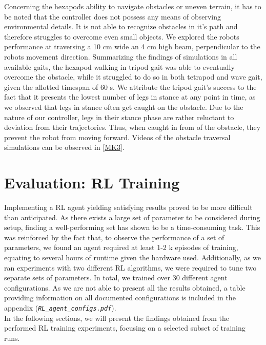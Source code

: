 Concerning the hexapods ability to navigate obstacles or uneven terrain, it has to be noted that the controller does not possess any means of observing environmental details.
It is not able to recognize obstacles in it's path and therefore struggles to overcome even small objects.
We explored the robots performance at traversing a 10 cm wide an 4 cm high beam, perpendicular to the robots movement direction.
Summarizing the findings of simulations in all available gaits, the hexapod walking in tripod gait was able to eventually overcome the obstacle, while it struggled to do so in both tetrapod and wave gait, given the allotted timespan of 60 s.
We attribute the tripod gait's success to the fact that it presents the lowest number of legs in stance at any point in time, as we observed that legs in stance often get caught on the obstacle.
Due to the nature of our controller, legs in their stance phase are rather reluctant to deviation from their trajectories.
Thus, when caught in from of the obstacle, they prevent the robot from moving forward.
Videos of the obstacle traversal simulations can be observed in [\hyperref[vid: MK1]{MK3}].


\section{Evaluation: RL Training}

Implementing a RL agent yielding satisfying results proved to be more difficult than anticipated.
As there exists a large set of parameter to be considered during setup, finding a well-performing set has shown to be a time-consuming task.
This was reinforced by the fact that, to observe the performance of a set of parameters, we found an agent required at least 1-2 k episodes of training, equating to several hours of runtime given the hardware used.
Additionally, as we ran experiments with two different RL algorithms, we were required to tune two separate sets of parameters.
In total, we trained over 30 different agent configurations.
As we are not able to present all the results obtained, a table providing information on all documented configurations is included in the appendix (\emph{\nolinkurl{RL_agent_configs.pdf}}).\\
In the following sections, we will present the findings obtained from the performed RL training experiments, focusing on a selected subset of training runs.


